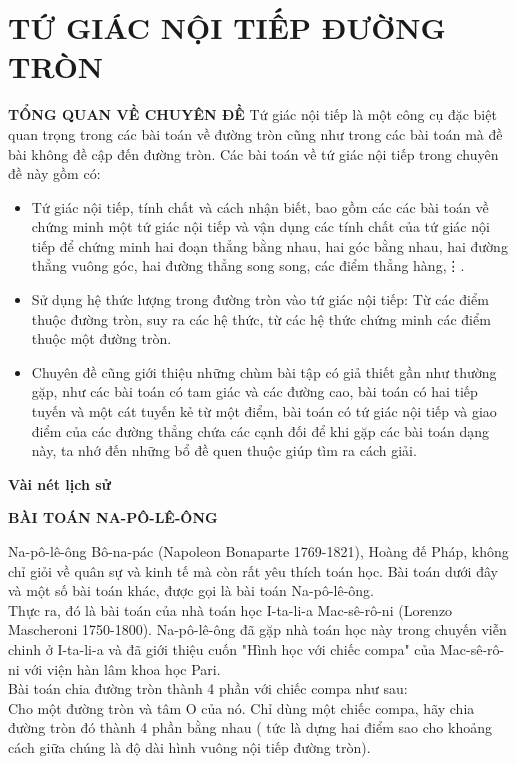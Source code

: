 \section{TỨ GIÁC NỘI TIẾP ĐƯỜNG TRÒN}
\large \textbf{ TỔNG QUAN VỀ CHUYÊN ĐỀ}
\renewcommand{\labelitemi}{$-$}
Tứ giác nội tiếp là một công cụ đặc biệt quan trọng trong các bài toán về đường tròn cũng như trong các bài toán mà đề bài không đề cập đến đường tròn.
Các bài toán về tứ giác nội tiếp trong chuyên đề này gồm có:
\begin{itemize}
	\item Tứ giác nội tiếp, tính chất và cách nhận biết, bao gồm các các bài toán về chứng minh một tứ giác nội tiếp và vận dụng các tính chất của tứ giác nội tiếp để chứng minh hai đoạn thẳng bằng nhau, hai góc bằng nhau, hai đường thẳng vuông góc, hai đường thẳng song song, các điểm thẳng hàng,\vdots.
	\item Sử dụng hệ thức lượng trong đường tròn vào tứ giác nội tiếp: Từ các điểm thuộc đường tròn, suy ra các hệ thức, từ các hệ thức chứng minh các điểm thuộc một đường tròn.
	\item Chuyên đề cũng giới thiệu những chùm bài tập có giả thiết gần như thường gặp, như các bài toán có tam giác và các đường cao, bài toán có hai tiếp tuyến và một cát tuyến kẻ từ một điểm, bài toán có tứ giác nội tiếp và giao điểm của các đường thẳng chứa các cạnh đối để khi gặp các bài toán dạng này, ta nhớ đến những bổ đề quen thuộc giúp tìm ra cách giải.
\end{itemize}
\large \textbf{Vài nét lịch sử}
\begin{center}
	\large \textbf{BÀI TOÁN NA-PÔ-LÊ-ÔNG}
\end{center}
{\hspace{1 cm}Na-pô-lê-ông Bô-na-pác (Napoleon Bonaparte 1769-1821), Hoàng đế Pháp, không chỉ giỏi về quân sự và kinh tế mà còn rất yêu thích toán học. Bài toán dưới đây và một số bài toán khác, được gọi là bài toán Na-pô-lê-ông.\\
	\hspace{1 cm}Thực ra, đó là bài toán của nhà toán học I-ta-li-a Mac-sê-rô-ni (Lorenzo Mascheroni 1750-1800). Na-pô-lê-ông đã gặp nhà toán học này trong chuyến viễn chinh ở I-ta-li-a và đã giới thiệu cuốn "Hình học với chiếc compa" của Mac-sê-rô-ni với viện hàn lâm khoa học Pari. \\
	\hspace{1 cm}Bài toán chia đường tròn thành 4 phần với chiếc compa như sau:\\
	\hspace{1 cm}Cho một đường tròn và tâm O của nó. Chỉ dùng một chiếc compa, hãy chia đường tròn đó thành 4 phần bằng nhau ( tức là dựng hai điểm sao cho khoảng cách giữa chúng là độ dài hình vuông nội tiếp đường tròn).}
